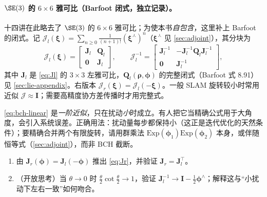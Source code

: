 \paragraph{$\SE(3)$ 的 $6\times6$ 雅可比（Barfoot 闭式，独立记录）。}
十四讲在此略去了 $\SE(3)$ 的 $6\times6$ 雅可比；为使本书\emph{自包含}，这里补上 Barfoot\cite{barfoot2024state} 的闭式。记 $\boldsymbol{\mathcal{J}}_l(\boldsymbol{\xi})=\sum_{n\ge0}\frac{1}{(n+1)!}(\boldsymbol{\xi}^\curlywedge)^n$（$\boldsymbol{\xi}^\curlywedge$ 见 \cref{sec:adjoint}），其分块为
\begin{equation}
  \boldsymbol{\mathcal{J}}_l(\boldsymbol{\xi})=\begin{bmatrix}\mathbf{J}_l&\mathbf{Q}_l\\\mathbf{0}&\mathbf{J}_l\end{bmatrix},\qquad
  \boldsymbol{\mathcal{J}}_l^{-1}=\begin{bmatrix}\mathbf{J}_l^{-1}&-\mathbf{J}_l^{-1}\mathbf{Q}_l\mathbf{J}_l^{-1}\\\mathbf{0}&\mathbf{J}_l^{-1}\end{bmatrix},
  \label{eq:se3-6x6}
\end{equation}
其中 $\mathbf{J}_l$ 是 \cref{eq:Jl} 的 $3\times3$ 左雅可比，$\mathbf{Q}_l(\boldsymbol{\rho},\boldsymbol{\phi})$ 的完整闭式（Barfoot 式 8.91）见 \cref{sec:lie-appendix}。右版本 $\boldsymbol{\mathcal{J}}_r(\boldsymbol{\xi})=\boldsymbol{\mathcal{J}}_l(-\boldsymbol{\xi})$。一般 SLAM 旋转较小时常用近似 $\boldsymbol{\mathcal{J}}\approx\mathbf{I}$；需要高精度协方差传播时才用完整式。

\begin{pitfall}
\cref{eq:bch-linear} 是\emph{一阶近似}，只在扰动\emph{小}时成立。有人把它当精确公式用于大角度，会引入系统误差。正确用法：扰动量每步都保持小（这正是迭代优化的天然条件）；要精确合并两个有限旋转，请用群乘法 $\mathrm{Exp}(\boldsymbol{\phi}_1)\mathrm{Exp}(\boldsymbol{\phi}_2)$ 本身，或伴随恒等式（\cref{sec:adjoint}），而非 BCH 截断。
\end{pitfall}

\begin{practice}
\begin{enumerate}
  \item 由 $\mathbf{J}_r(\boldsymbol{\phi})=\mathbf{J}_l(-\boldsymbol{\phi})$ 推出 \cref{eq:Jr}，并验证 $\mathbf{J}_r=\mathbf{J}_l^\top$。
  \item （开放思考）当 $\theta\to0$ 时 $\tfrac{\theta}{2}\cot\tfrac{\theta}{2}\to1$，验证 $\mathbf{J}_l^{-1}\to\mathbf{I}-\tfrac12\boldsymbol{\phi}^\wedge$；解释这与“小扰动下左右一致”如何吻合。
\end{enumerate}
\end{practice}

